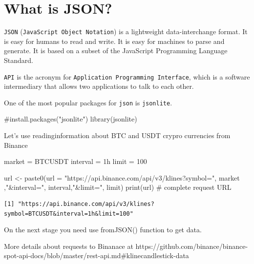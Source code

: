 \documentclass[
  letterpaper,
  DIV=11,
  numbers=noendperiod]{scrreprt}
\newenvironment{Shaded}{\begin{snugshade}}{\end{snugshade}}
\newcommand{\AttributeTok}[1]{\textcolor[rgb]{0.40,0.45,0.13}{#1}}
\newcommand{\CommentTok}[1]{\textcolor[rgb]{0.37,0.37,0.37}{#1}}
\newcommand{\DecValTok}[1]{\textcolor[rgb]{0.68,0.00,0.00}{#1}}
\newcommand{\FunctionTok}[1]{\textcolor[rgb]{0.28,0.35,0.67}{#1}}
\newcommand{\NormalTok}[1]{\textcolor[rgb]{0.00,0.23,0.31}{#1}}
\newcommand{\OtherTok}[1]{\textcolor[rgb]{0.00,0.23,0.31}{#1}}
\newcommand{\StringTok}[1]{\textcolor[rgb]{0.13,0.47,0.30}{#1}}
\begin{document}
\section{What is JSON?}\label{what-is-json}

\texttt{JSON} (\texttt{JavaScript\ Object\ Notation}) is a lightweight
data-interchange format. It is easy for humans to read and write. It is
easy for machines to parse and generate. It is based on a subset of the
JavaScript Programming Language Standard.

\texttt{API} is the acronym for
\texttt{Application\ Programming\ Interface}, which is a software
intermediary that allows two applications to talk to each other.

One of the most popular packages for \texttt{json} is \texttt{jsonlite}.

\begin{Shaded}
\begin{Highlighting}[]
\CommentTok{\#install.packages("jsonlite")}
\FunctionTok{library}\NormalTok{(jsonlite)}
\end{Highlighting}
\end{Shaded}

Let's use readinginformation about BTC and USDT crypro currencies from
Binance

\begin{Shaded}
\begin{Highlighting}[]
\NormalTok{market }\OtherTok{=} \StringTok{\textquotesingle{}BTCUSDT\textquotesingle{}}
\NormalTok{interval }\OtherTok{=} \StringTok{\textquotesingle{}1h\textquotesingle{}}
\NormalTok{limit }\OtherTok{=} \DecValTok{100}

\NormalTok{url }\OtherTok{\textless{}{-}} \FunctionTok{paste0}\NormalTok{(}\AttributeTok{url =} \StringTok{"https://api.binance.com/api/v3/klines?symbol="}\NormalTok{, market ,}\StringTok{"\&interval="}\NormalTok{, interval,}\StringTok{"\&limit="}\NormalTok{, limit)}
\FunctionTok{print}\NormalTok{(url) }\CommentTok{\# complete request URL}
\end{Highlighting}
\end{Shaded}

\begin{verbatim}
[1] "https://api.binance.com/api/v3/klines?symbol=BTCUSDT&interval=1h&limit=100"
\end{verbatim}

On the next stage you need use fromJSON() function to get data.

More details about requests to Binanace at
https://github.com/binance/binance-spot-api-docs/blob/master/rest-api.md\#klinecandlestick-data
\end{document}
